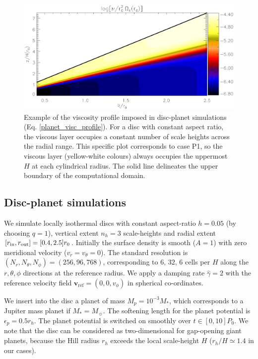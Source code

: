 \begin{figure}
  \centering
  \includegraphics[width=\linewidth]{figures/pdisk_visc2d_planet}
  \caption{Example of the viscosity profile
    imposed in disc-planet simulations
    (Eq. \ref{planet_visc_profile}).  
    For a disc with constant aspect ratio, the viscous
    layer occupies a constant number of scale heights across the
    radial range. This specific plot corresponds to case P1, so the
    viscous layer (yellow-white colours) always occupies the uppermost
    $H$ at each cylindrical radius. 
    The solid line delineates the upper boundary of the computational
    domain. 
    \label{planet_visc2d}}
\end{figure}

\subsection{Disc-planet simulations} 
We simulate locally isothermal discs with constant aspect-ratio
$h=0.05$ (by choosing $q=1$), vertical extent $n_h=3$ scale-heights 
and radial extent $[r_\mathrm{in},r_\mathrm{out}]=[0.4,2.5]r_0$. Initially the surface density is smooth
($A=1$) with zero meridional velocity ($v_r=v_\theta=0$). 
The standard resolution is $(N_r, N_\theta,
N_\phi)=(256, 96, 768)$, corresponding to $6,\,32,\,6$ 
cells per $H$ along the $r,\theta,\phi$ directions at the reference
radius. We apply a damping rate $\hat{\gamma}=2$ with the reference
velocity field $\bm{v}_\mathrm{ref}=(0,0,v_\phi)$ in spherical
co-ordinates.   

We insert into the disc a planet of mass  
$M_p=10^{-3}M_*$, which corresponds to a Jupiter mass planet if
$M_*=M_{\sun}$. The softening length for the planet potential is
$\epsilon_p=0.5r_h$. The planet potential is switched on 
smoothly over $t\in[0,10]P_0$. We note that the disc can be considered
as two-dimensional for gap-opening giant planets, because the Hill
radius $r_h$ exceeds the local scale-height $H$ ($r_h/H\simeq1.4$
in our cases).   

